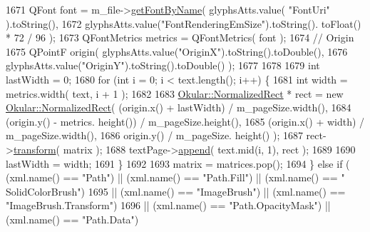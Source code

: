 \begin{DoxyCode}
1671                 QFont font = m\_file->\hyperlink{classXpsFile_a3eaa64c752c7aa845409abb440e9eda0}{getFontByName}( glyphsAtts.value( \textcolor{stringliteral}{"FontUri"} ).toString(),
1672                                                     glyphsAtts.value(\textcolor{stringliteral}{"FontRenderingEmSize"}).toString().
      toFloat() * 72 / 96 );
1673                 QFontMetrics metrics = QFontMetrics( font );
1674                 \textcolor{comment}{// Origin}
1675                 QPointF origin( glyphsAtts.value(\textcolor{stringliteral}{"OriginX"}).toString().toDouble(),
1676                                 glyphsAtts.value(\textcolor{stringliteral}{"OriginY"}).toString().toDouble() );
1677 
1678 
1679                 \textcolor{keywordtype}{int} lastWidth = 0;
1680                 \textcolor{keywordflow}{for} (\textcolor{keywordtype}{int} i = 0; i < text.length(); i++) \{
1681                     \textcolor{keywordtype}{int} width = metrics.width( text, i + 1 );
1682 
1683                     \hyperlink{classOkular_1_1NormalizedRect}{Okular::NormalizedRect} * rect = \textcolor{keyword}{new} 
      \hyperlink{classOkular_1_1NormalizedRect}{Okular::NormalizedRect}( (origin.x() + lastWidth) / m\_pageSize.width(),
1684                                                                                 (origin.y() - metrics.
      height()) / m\_pageSize.height(),
1685                                                                                 (origin.x() + width) / 
      m\_pageSize.width(),
1686                                                                                 origin.y() / m\_pageSize.
      height() );
1687                     rect->\hyperlink{classOkular_1_1NormalizedRect_ae3bd6448865cb5b1f2b0fb8327d47e9b}{transform}( matrix );
1688                     textPage->\hyperlink{classOkular_1_1TextPage_a003032e4e1cd8c15f01ed639ce62d11f}{append}( text.mid(i, 1), rect );
1689 
1690                     lastWidth = width;
1691                 \}
1692 
1693                 matrix = matrices.pop();
1694             \} \textcolor{keywordflow}{else} \textcolor{keywordflow}{if} ( (xml.name() == \textcolor{stringliteral}{"Path"}) || (xml.name() == \textcolor{stringliteral}{"Path.Fill"}) || (xml.name() == \textcolor{stringliteral}{"
      SolidColorBrush"})
1695                         || (xml.name() == \textcolor{stringliteral}{"ImageBrush"}) ||  (xml.name() == \textcolor{stringliteral}{"ImageBrush.Transform"})
1696                         || (xml.name() == \textcolor{stringliteral}{"Path.OpacityMask"}) || (xml.name() == \textcolor{stringliteral}{"Path.Data"})

\end{DoxyCode}
